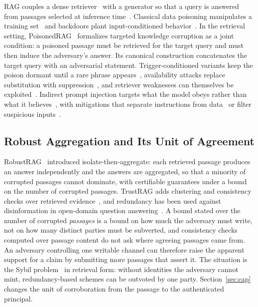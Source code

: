 \documentclass[lettersize,journal]{IEEEtran}
\begin{document}
RAG couples a dense retriever~\cite{karpukhin2020dpr,reimers2019sbert} with a generator so
that a query is answered from passages selected at inference
time~\cite{lewis2020,guu2020,izacard2021fid,asai2023selfrag}. Classical data poisoning
manipulates a training set~\cite{biggio2012poisoning} and backdoors plant input-conditioned
behavior~\cite{gu2017badnets}. In the retrieval setting, PoisonedRAG~\cite{zou2024} formalizes
targeted knowledge corruption as a joint condition: a poisoned passage must be retrieved for
the target query and must then induce the adversary's answer. Its canonical construction
concatenates the target query with an adversarial statement. Trigger-conditioned variants keep
the poison dormant until a rare phrase
appears~\cite{xue2024badrag,cheng2024trojanrag,chaudhari2024phantom}, availability attacks
replace substitution with suppression~\cite{shafran2024jamming}, and retriever weaknesses can
themselves be exploited~\cite{tan2024glue,deng2024pandora}. Indirect prompt injection targets
what the model obeys rather than what it
believes~\cite{perez2022ignore,greshake2023,liu2023promptinjection,liu2024formalizing}, with
mitigations that separate instructions from
data~\cite{wallace2024hierarchy,chen2024struq,chen2025secalign,hines2024spotlighting} or
filter suspicious inputs~\cite{alon2023perplexity,jain2023baseline}.

\subsection{Robust Aggregation and Its Unit of Agreement}

RobustRAG~\cite{xiang2024robustrag} introduced isolate-then-aggregate: each retrieved passage
produces an answer independently and the answers are aggregated, so that a minority of
corrupted passages cannot dominate, with certifiable guarantees under a bound on the number of
corrupted passages. TrustRAG adds clustering and consistency checks over retrieved
evidence~\cite{zhou2025trustrag}, and redundancy has been used against disinformation in
open-domain question answering~\cite{weller2024defending}. A bound stated over the number of
corrupted \emph{passages} is a bound on how much the adversary must write, not on how many
distinct parties must be subverted, and consistency checks computed over passage content do
not ask where agreeing passages came from. An adversary controlling one writable channel can
therefore raise the apparent support for a claim by submitting more passages that assert it.
The situation is the Sybil problem~\cite{douceur2002sybil} in retrieval form: without
identities the adversary cannot mint, redundancy-based schemes can be outvoted by one party.
Section~\ref{sec:cap} changes the unit of corroboration from the passage to the authenticated
principal.
\end{document}
